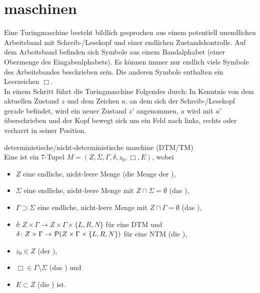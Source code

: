 \section{%
    maschinen%
}

\begin{Bem}
    Eine Turingmaschine besteht bildlich gesprochen aus einem potentiell
    unendlichen Arbeitsband mit Schreib-/Lesekopf und einer endlichen
    Zustandskontrolle.
    Auf dem Arbeitsband befinden sich Symbole aus einem Bandalphabet
    (einer Obermenge des Eingabealphabets).
    Es können immer nur endlich viele Symbole des Arbeitsbandes beschrieben
    sein.
    Die anderen Symbole enthalten ein Leerzeichen $\Box$.\\
    In einem Schritt führt die Turingmaschine Folgendes durch:
    In Kenntnis von dem aktuellen Zustand $z$ und dem Zeichen $a$, an dem sich
    der Schreib-/Lesekopf gerade befindet, wird ein neuer Zustand $z'$
    angenommen, $a$ wird mit $a'$ überschrieben und der Kopf bewegt sich um
    ein Feld nach links, rechts oder verharrt in seiner Position.
\end{Bem}

\linie
\pagebreak

\begin{Def}{deterministische/nicht-deterministische
            maschine (DTM/TM)}\\
    Eine 
    ist ein $7$-Tupel $M = (Z, \Sigma, \Gamma, \delta, z_0, \Box, E)$, wobei
    \begin{itemize}
        \item
        $Z$ eine endliche, nicht-leere Menge
        (die Menge der ),

        \item
        $\Sigma$ eine endliche, nicht-leere Menge
        mit $Z \cap \Sigma = \emptyset$
        (das ),

        \item
        $\Gamma \supset \Sigma$ eine endliche, nicht-leere Menge
        mit $Z \cap \Gamma = \emptyset$
        (das ),

        \item
        $\delta\colon Z \times \Gamma \rightarrow
        Z \times \Gamma \times \{L, R, N\}$ für eine DTM und\\
        $\delta\colon Z \times \Gamma \rightarrow
        \P(Z \times \Gamma \times \{L, R, N\})$ für eine NTM
        (die ),

        \item
        $z_0 \in Z$ (der ),

        \item
        $\Box \in \Gamma \setminus \Sigma$ (das ) und

        \item
        $E \subset Z$ (die ) ist.
    \end{itemize}
\end{Def}

